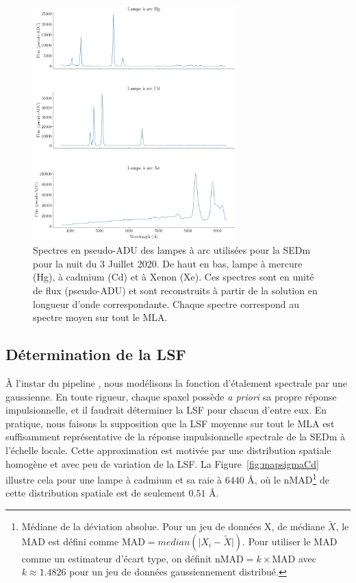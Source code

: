 \documentclass[../main/main.tex]{subfiles}
\begin{document}
\begin{figure}[h!]
  \centering
  \includegraphics[width=0.7\textwidth]{../figures/06_irf/arclamps.png}
  \caption[Spectres des lampes à arc utilisées pour la SEDm]{Spectres en pseudo-ADU
    des lampes à arc utilisées pour la SEDm pour la nuit du 3 Juillet
    2020. De haut en bas, lampe à mercure (Hg), à cadmium
    (Cd) et à Xenon (Xe). Ces spectres sont en unité de flux
    (pseudo-ADU) et sont reconstruits à partir
  de la solution en longueur d'onde correspondante. Chaque spectre
  correspond au spectre moyen sur tout le MLA.}
  \label{fig:arclamps}
\end{figure}

\subsection{Détermination de la LSF}

À l'instar du pipeline \pysedm, nous modélisons la fonction d'étalement
spectrale par une gaussienne.
En toute rigueur, chaque spaxel possède \textit{a priori} sa propre réponse
impulsionnelle, et il faudrait déterminer la LSF pour chacun d'entre
eux. En pratique, nous faisons la supposition que la LSF moyenne sur
tout le MLA est suffisamment représentative de la réponse impulsionnelle
spectrale de la SEDm à l'échelle locale. Cette approximation est motivée
par une distribution spatiale homogène et avec peu de variation de la
LSF. La Figure~\ref{fig:mapsigmaCd} illustre cela pour une lampe à
cadmium et sa raie à $6440$ \AA, où le nMAD\footnote{Médiane de la
  déviation absolue. Pour un jeu de données X, de médiane $\tilde{X}$, le
  MAD est défini comme $\text{MAD}=median(\lvert
  X_{i}-\tilde{X}\rvert)$. Pour utiliser le MAD comme un estimateur
  d'écart type, on définit $\text{nMAD}=k\times\text{MAD}$ avec $k\approx1.4826$ pour
  un jeu de données gaussiennement distribué.} de cette distribution
spatiale est de seulement $0.51$ \AA.
\end{document}
